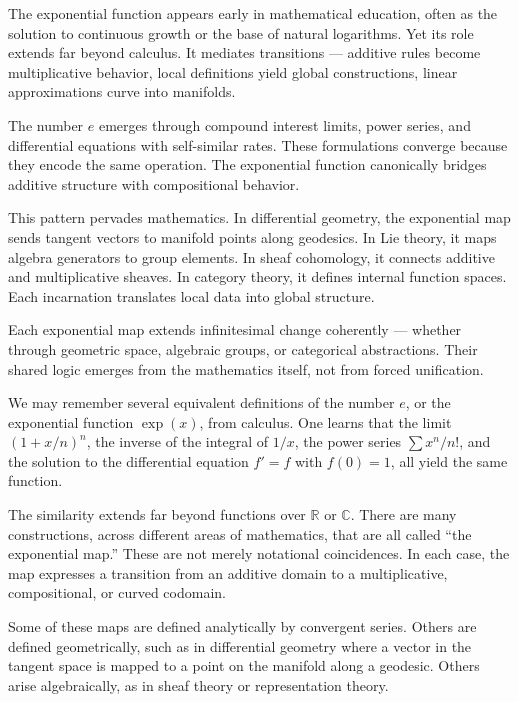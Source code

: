 The exponential function appears early in mathematical education, often as the solution to continuous growth or the base of natural logarithms. Yet its role extends far beyond calculus. It mediates transitions — additive rules become multiplicative behavior, local definitions yield global constructions, linear approximations curve into manifolds.

The number \( e \) emerges through compound interest limits, power series, and differential equations with self-similar rates. These formulations converge because they encode the same operation. The exponential function canonically bridges additive structure with compositional behavior.

This pattern pervades mathematics. In differential geometry, the exponential map sends tangent vectors to manifold points along geodesics. In Lie theory, it maps algebra generators to group elements. In sheaf cohomology, it connects additive and multiplicative sheaves. In category theory, it defines internal function spaces. Each incarnation translates local data into global structure.

Each exponential map extends infinitesimal change coherently — whether through geometric space, algebraic groups, or categorical abstractions. Their shared logic emerges from the mathematics itself, not from forced unification.

We may remember several equivalent definitions of the number \( e \), or the exponential function \( \exp(x) \), from calculus. One learns that the limit $\left(1 + x/n\right)^n$,
the inverse of the integral of \( 1/x \), the power series \( \sum x^n/n! \), and the solution to the differential equation \( f' = f \) with \( f(0) = 1 \), all yield the same function.

The similarity extends far beyond functions over \( \mathbb{R} \) or \( \mathbb{C} \). There are many constructions, across different areas of mathematics, that are all called “the exponential map.” These are not merely notational coincidences. In each case, the map expresses a transition from an additive domain to a multiplicative, compositional, or curved codomain.

Some of these maps are defined analytically by convergent series. Others are defined geometrically, such as in differential geometry where a vector in the tangent space is mapped to a point on the manifold along a geodesic. Others arise algebraically, as in sheaf theory or representation theory. 


